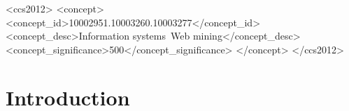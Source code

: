 \documentclass[sigconf, review]{acmart}
\begin{document}

\begin{CCSXML}
<ccs2012>
   <concept>
       <concept_id>10002951.10003260.10003277</concept_id>
       <concept_desc>Information systems~Web mining</concept_desc>
       <concept_significance>500</concept_significance>
       </concept>
 </ccs2012>
\end{CCSXML}



\maketitle

\section{Introduction}



\end{document}
